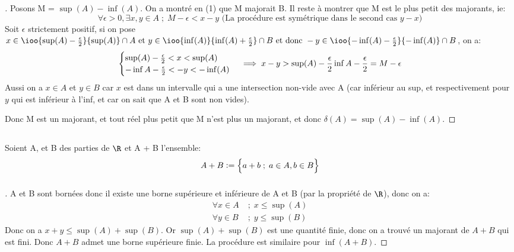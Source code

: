 \subsubsection*{}
\begin{proof}[\unskip\nopunct]
Posons M = \(\sup(A) - \inf(A)\).
On a montré en (1) que M majorait B. Il reste à montrer que M est le plus petit des majorants, ie:
\[
   \forall \epsilon > 0, \exists x, y \in A \; ; \; M - \epsilon < x - y \text{ (La procédure est symétrique dans le second cas \(y - x\))}
\]
Soit \(\epsilon\) strictement positif, si on pose \(x \in \ioo{\sup(A) - \frac{\epsilon}{2}}{\sup(A)} \cap A \text{ et } y \in \ioo{\inf(A)}{\inf(A) + \frac{\epsilon}{2}} \cap B \text{ et donc } -y \in \ioo{-\inf(A) - \frac{\epsilon}{2}}{-\inf(A)}\cap B\), on a:
\[
   \begin{cases}
      \sup(A) - \frac{\epsilon}{2} < x < \sup(A)   \\
      -\inf{A} - \frac{\epsilon}{2} < -y < -\inf(A) \\
   \end{cases} \implies
   x - y> \sup(A) - \frac{\epsilon}{2} \inf{A} - \frac{\epsilon}{2} = M - \epsilon\\ 
\]
Aussi on a \(x \in A\) et \(y \in B\) car \(x\) est dans un intervalle qui a une intersection non-vide avec A (car inférieur au sup, et respectivement pour \(y\) qui est inférieur à l'inf, et car on sait que A et B sont non vides).

Donc M est un majorant, et tout réel plus petit que M n'est plus un majorant, et donc \(\delta(A) = \sup(A) - \inf(A)\).
\end{proof}
\pagebreak

\subsection[Ensemble somme]{}
Soient A, et B des parties de \(\R\) et A + B l'ensemble:
\[
A + B:= \Bigl\{ a + b \; ; \; a\in A, b\in  B\Bigl\}
\]
\subsubsection*{}
\begin{proof}[\unskip\nopunct]
A et B sont bornées donc il existe une borne supérieure et inférieure de A et B (par la propriété de \(\R\)), donc on a:
\begin{align*}
   \forall x \in A \; &; \; x \leq \sup(A) \\
   \forall y \in B \; &; \; y \leq \sup(B)
\end{align*}
Donc on a \(x + y \leq \sup(A) + \sup(B)\). Or \(\sup(A) + \sup(B)\) est une quantité finie, donc on a trouvé un majorant de \(A + B\) qui est fini. Donc \(A + B\) admet une borne supérieure finie. La procédure est similaire pour \(\inf(A + B)\).
\end{proof}
